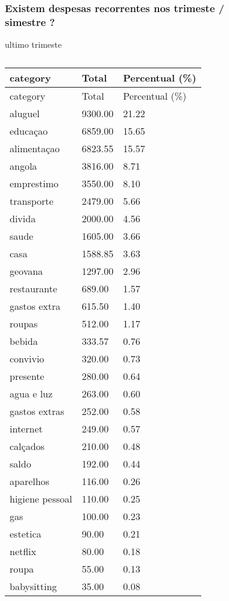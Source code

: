 \documentclass[
  8pt,
  a4paper,
  DIV=11,
  numbers=noendperiod]{scrartcl}
\begin{document}
\begin{figure}

\begin{minipage}{0.50\linewidth}

\subsubsection{Existem despesas recorrentes nos trimeste / simestre
?}\label{existem-despesas-recorrentes-nos-trimeste-simestre}

ultimo trimeste\end{minipage}%
%
\begin{minipage}{0.50\linewidth}

\end{minipage}%
\newline
\begin{minipage}{0.50\linewidth}

\begin{longtable}[]{@{}lll@{}}
\caption{}\label{T_81866}\tabularnewline
\toprule\noalign{}
category & Total & Percentual (\%) \\
\midrule\noalign{}
\endfirsthead
\toprule\noalign{}
category & Total & Percentual (\%) \\
\midrule\noalign{}
\endhead
\bottomrule\noalign{}
\endlastfoot
aluguel & 9300.00 & 21.22 \\
educaçao & 6859.00 & 15.65 \\
alimentaçao & 6823.55 & 15.57 \\
angola & 3816.00 & 8.71 \\
emprestimo & 3550.00 & 8.10 \\
transporte & 2479.00 & 5.66 \\
divida & 2000.00 & 4.56 \\
saude & 1605.00 & 3.66 \\
casa & 1588.85 & 3.63 \\
geovana & 1297.00 & 2.96 \\
restaurante & 689.00 & 1.57 \\
gastos extra & 615.50 & 1.40 \\
roupas & 512.00 & 1.17 \\
bebida & 333.57 & 0.76 \\
convivio & 320.00 & 0.73 \\
presente & 280.00 & 0.64 \\
agua e luz & 263.00 & 0.60 \\
gastos extras & 252.00 & 0.58 \\
internet & 249.00 & 0.57 \\
calçados & 210.00 & 0.48 \\
saldo & 192.00 & 0.44 \\
aparelhos & 116.00 & 0.26 \\
higiene pessoal & 110.00 & 0.25 \\
gas & 100.00 & 0.23 \\
estetica & 90.00 & 0.21 \\
netflix & 80.00 & 0.18 \\
roupa & 55.00 & 0.13 \\
babysitting & 35.00 & 0.08 \\
\end{longtable}


\end{minipage}
\end{figure}
\end{document}
